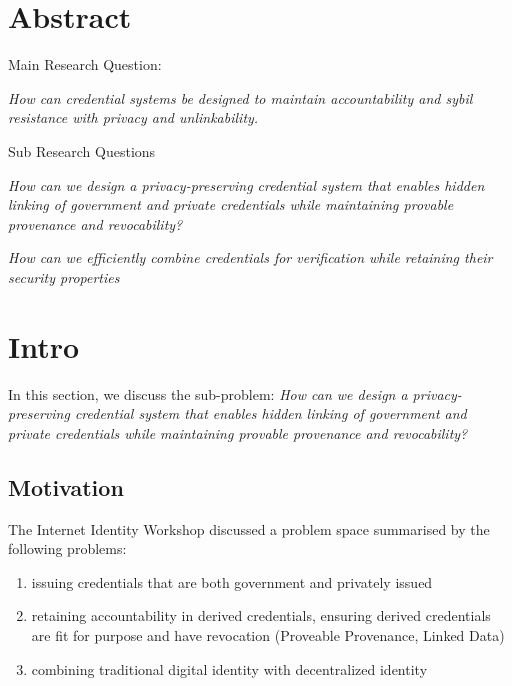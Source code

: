\section{Abstract}
Main Research Question: 

\textit{How can credential systems be designed to maintain accountability and sybil resistance with privacy and unlinkability. }

\noindent Sub Research Questions

\textit{How can we design a privacy-preserving credential system that enables hidden linking of government and private credentials while maintaining provable provenance and revocability?}

\textit{How can we efficiently combine credentials for verification while retaining their security properties}

\newpage
\section{Intro}
In this section, we discuss the sub-problem:
\textit{How can we design a privacy-preserving credential system that enables hidden linking of government and private credentials while maintaining provable provenance and revocability?}





\subsection{Motivation}



The Internet Identity Workshop discussed a problem space summarised by the following problems:
\begin{enumerate}
    \item issuing credentials that are both government and privately issued
    \item retaining accountability in derived credentials, ensuring derived credentials are fit for purpose and have revocation (Proveable Provenance, Linked Data)
    \item combining traditional digital identity with decentralized identity
\end{enumerate}

